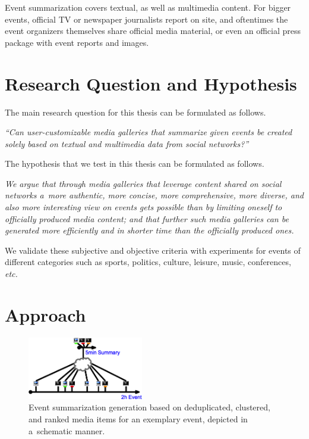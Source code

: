 Event summarization covers textual,
as well as multimedia content.
For bigger events, official TV or newspaper journalists
report on site, and oftentimes the event organizers themselves
share official media material,
or even an official press package with event reports and images.

\section{Research Question and Hypothesis}
The main research question for this thesis
can be formulated as follows.
 
\noindent \textit{``Can user-customizable
media galleries that summarize given events be
created solely based on textual and multimedia data
from social networks?''}

\noindent The hypothesis that we test in this thesis
can be formulated as follows.

\noindent \textit{We argue that
through media galleries that leverage content
shared on social networks
a~more \emph{authentic}, more \emph{concise},
more \emph{comprehensive}, more \emph{diverse},
and also more \emph{interesting}
view on events gets possible than by limiting oneself
to officially produced media content;
and that further such media galleries can be generated
more \emph{efficiently} and \emph{in shorter time}
than the officially produced ones.}

\noindent We validate these subjective and objective
criteria with experiments for events of different categories
such as sports, politics, culture, leisure,
music, conferences, \emph{etc.}

\section{Approach}
\begin{figure}[htb!]
  \centering
  \includegraphics[width=0.45\textwidth]{thesis-diagram.png}
  \caption{Event summarization generation based on deduplicated, clustered, and ranked media items for an exemplary event, depicted in a~schematic manner.}     
  \label{fig:thesis-diagram}
\end{figure}

